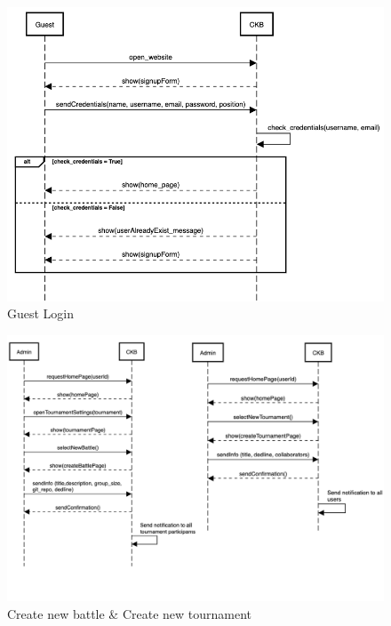 \documentclass{article}
\begin{document}
            \begin{figure}[!ht]
                \centering
                \includegraphics[width=13cm]{LaudiziMarusicMassarelli/RASD/SignupSD.png}
                \caption{Guest Login}
                \label{fig:login}
            \end{figure}

            \begin{figure}[!ht]
                \centering
                \includegraphics[width=15cm]{LaudiziMarusicMassarelli/RASD/create.png}
                \caption{Create new battle \& Create new tournament}
                \label{fig:create}
            \end{figure}
\end{document}

